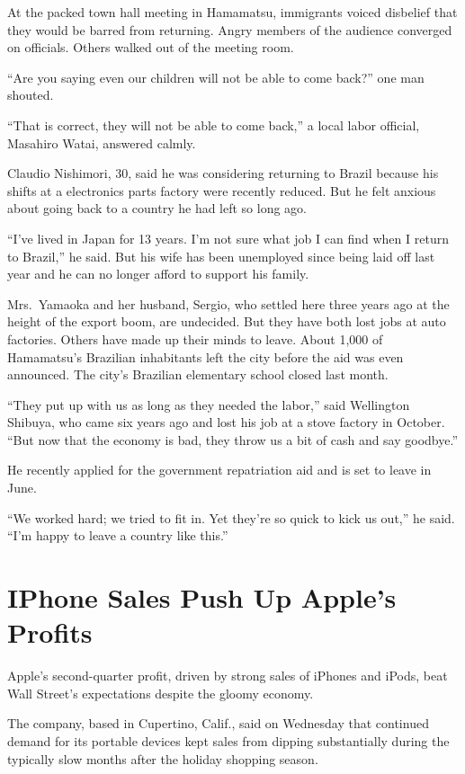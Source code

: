 \documentclass[12pt,a4paper,onecolumn]{article}
\begin{document}
At the packed town hall meeting in Hamamatsu, immigrants voiced disbelief that they would be barred
from returning. Angry members of the audience converged on officials. Others walked out of the
meeting room.

``Are you saying even our children will not be able to come back?'' one man shouted.

``That is correct, they will not be able to come back,'' a local labor official, Masahiro Watai,
answered calmly.

Claudio Nishimori, 30, said he was considering returning to Brazil because his shifts at a
electronics parts factory were recently reduced. But he felt anxious about going back to a country
he had left so long ago.

``I've lived in Japan for 13 years. I'm not sure what job I can find when I return to Brazil,'' he
said. But his wife has been unemployed since being laid off last year and he can no longer afford to
support his family.

Mrs.~Yamaoka and her husband, Sergio, who settled here three years ago at the height of the export
boom, are undecided. But they have both lost jobs at auto factories. Others have made up their minds
to leave. About 1,000 of Hamamatsu's Brazilian inhabitants left the city before the aid was even
announced. The city's Brazilian elementary school closed last month.

``They put up with us as long as they needed the labor,'' said Wellington Shibuya, who came six
years ago and lost his job at a stove factory in October. ``But now that the economy is bad, they
throw us a bit of cash and say goodbye.''

He recently applied for the government repatriation aid and is set to leave in June.

``We worked hard; we tried to fit in. Yet they're so quick to kick us out,'' he said. ``I'm happy to
leave a country like this.''

\section{IPhone Sales Push Up Apple's Profits}

Apple's second-quarter profit, driven by strong sales of iPhones and iPods, beat Wall Street's
expectations despite the gloomy economy.

The company, based in Cupertino, Calif., said on Wednesday that continued demand for its portable
devices kept sales from dipping substantially during the typically slow months after the holiday
shopping season.
\end{document}
